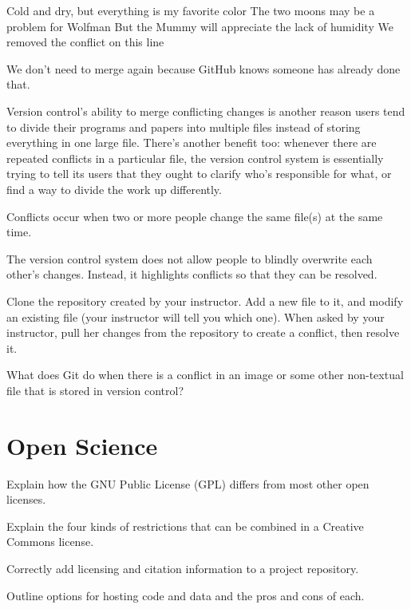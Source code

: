 \begin{VerbOut}
Cold and dry, but everything is my favorite color
The two moons may be a problem for Wolfman
But the Mummy will appreciate the lack of humidity
We removed the conflict on this line
\end{VerbOut}

We don't need to merge again because GitHub knows someone has already
done that.

Version control's ability to merge conflicting changes is another reason
users tend to divide their programs and papers into multiple files
instead of storing everything in one large file. There's another benefit
too: whenever there are repeated conflicts in a particular file, the
version control system is essentially trying to tell its users that they
ought to clarify who's responsible for what, or find a way to divide the
work up differently.

\begin{keypoints}
\begin{swcitemize}
\item
  Conflicts occur when two or more people change the same file(s) at the
  same time.
\item
  The version control system does not allow people to blindly overwrite
  each other's changes. Instead, it highlights conflicts so that they
  can be resolved.
\end{swcitemize}
\end{keypoints}

\begin{challenge}
  Clone the repository created by your instructor. Add a new file to it,
  and modify an existing file (your instructor will tell you which one).
  When asked by your instructor, pull her changes from the repository to
  create a conflict, then resolve it.
\end{challenge}

\begin{challenge}
  What does Git do when there is a conflict in an image or some other
  non-textual file that is stored in version control?
\end{challenge}

\section{Open Science}

\begin{objectives}
\begin{swcitemize}
\item
  Explain how the GNU Public License (GPL) differs from most other open
  licenses.
\item
  Explain the four kinds of restrictions that can be combined in a
  Creative Commons license.
\item
  Correctly add licensing and citation information to a project
  repository.
\item
  Outline options for hosting code and data and the pros and cons of
  each.
\end{swcitemize}
\end{objectives}

